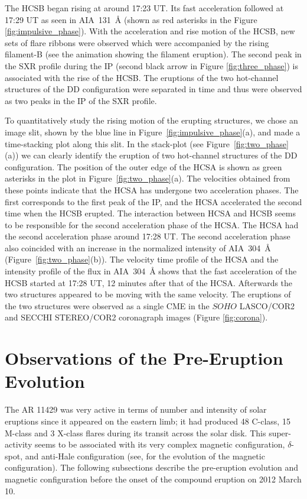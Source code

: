 \documentclass{aastex62}
\begin{document}
The HCSB began rising at around 17:23 UT. Its fast acceleration followed  at 17:29 UT as seen in AIA~131~\AA{} (shown as red asterisks in the Figure \ref{fig:impulsive_phase}). With the acceleration and rise motion of the HCSB, new sets of flare ribbons were observed which were accompanied by the rising filament-B (see the animation showing the filament eruption). The second peak in the SXR profile during the IP (second black arrow in Figure \ref{fig:three_phase}) is associated with the rise of the HCSB. The eruptions of the two hot-channel structures of the DD configuration were separated in time and thus were observed as two peaks in the IP of the SXR profile.

To quantitatively study the rising motion of the erupting structures, we chose an image slit, shown by the blue line in Figure~\ref{fig:impulsive_phase}(a), and made a time-stacking plot along this slit. In the stack-plot (see Figure~\ref{fig:two_phase}(a)) we can clearly identify the eruption of two hot-channel structures of the DD configuration. The position of the outer edge of the HCSA is shown as green asterisks in the plot in Figure~\ref{fig:two_phase}(a). The velocities obtained from these points indicate that the HCSA has undergone two acceleration phases. The first corresponds to the first peak of the IP, and the HCSA accelerated the second time when the HCSB erupted. The interaction between HCSA and HCSB seems to be responsible for the second acceleration phase of the HCSA. The HCSA had the second acceleration phase around 17:28 UT. The second acceleration phase also coincided with an increase in the normalized intensity of AIA~304~\AA{} (Figure~\ref{fig:two_phase}(b)). The velocity time profile of the HCSA and the intensity profile of the flux in AIA~304~\AA{}
shows that the fast acceleration of the HCSB started at 17:28 UT, 12 minutes after that of the HCSA. Afterwards the two structures appeared to be moving with the same velocity. The eruptions of the two structures were observed as a single CME in the $\textit{SOHO}$  LASCO/COR2 and SECCHI STEREO/COR2 coronagraph images (Figure \ref{fig:corona}).



\section{\textbf{Observations of the Pre-Eruption Evolution}}
\label{obs}
The AR 11429 was very active in terms of number and intensity of solar eruptions since it appeared on the eastern limb; it had produced 48 C-class, 15 M-class and 3 X-class flares during its transit across the solar disk. This super-activity seems to be associated with its very complex magnetic configuration, $\delta$-spot, and anti-Hale configuration (see, \citealt{Elmhamdi_etal_2014} for the evolution of the magnetic configuration). The following subsections describe the pre-eruption evolution and magnetic configuration before the onset of the compound eruption on 2012 March 10.
\end{document}
